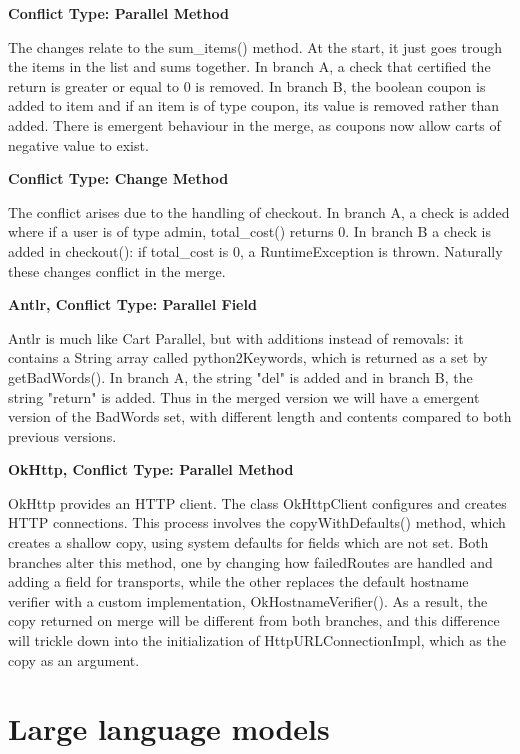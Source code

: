 \textbf{Conflict Type: Parallel Method}

The changes relate to the sum\_items() method. At the start, it just goes trough the items in the list and sums together. In branch A,
a check that certified the return is greater or equal to 0 is removed. In branch B, the boolean coupon is added to item and if an item
is of type coupon, its value is removed rather than added. There is emergent behaviour in the merge, as coupons now allow carts of negative
value to exist.

\textbf{Conflict Type: Change Method}

The conflict arises due to the handling of checkout. In branch A, a check is added where if a user is of type admin,
total\_cost() returns 0. In branch B a check is added in checkout(): if total\_cost is 0, a RuntimeException is thrown.
Naturally these changes conflict in the merge.

\textbf{Antlr, Conflict Type: Parallel Field}

Antlr is much like Cart Parallel, but with additions instead of removals: it contains a String array called python2Keywords, which is returned as a set by
getBadWords(). In branch A, the string "del" is added and in branch B, the string "return" is added. Thus in the merged version we will have a emergent version
of the BadWords set, with different length and contents compared to both previous versions.

\textbf{OkHttp, Conflict Type: Parallel Method}

OkHttp provides an HTTP client. The class OkHttpClient configures and creates HTTP connections. This process involves
the copyWithDefaults() method, which creates a shallow copy, using system defaults for fields which are not set. Both branches
alter this method, one by changing how failedRoutes are handled and adding a field for transports, while the other replaces
the default hostname verifier with a custom implementation, OkHostnameVerifier(). As a result, the copy returned on merge will
be different from both branches, and this difference will trickle down into the initialization of HttpURLConnectionImpl, which
as the copy as an argument.

\section{Large language models}


